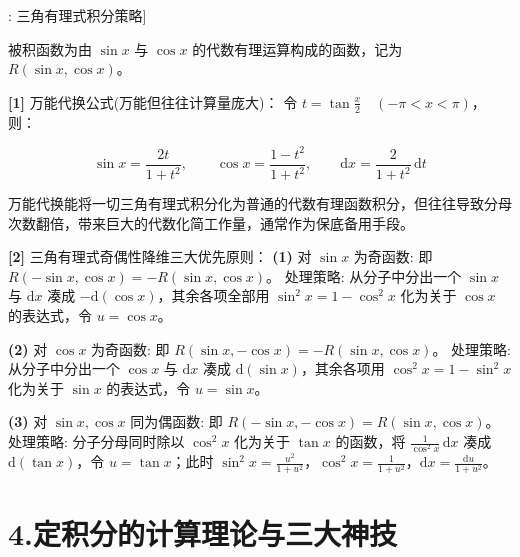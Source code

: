 \documentclass[11pt,a4paper,UTF8]{ctexart}
\begin{document}
\begin{thmbox}[方法[2]: 三角有理式积分策略]

被积函数为由 $\sin x$ 与 $\cos x$ 的代数有理运算构成的函数，记为 $R(\sin x, \cos x)$。

\textbf{[1]} 万能代换公式(万能但往往计算量庞大)：
令 $t = \tan\frac{x}{2} \quad (-\pi < x < \pi)$，则：


\begin{equation*}
\sin x = \frac{2t}{1+t^2}, \qquad \cos x = \frac{1-t^2}{1+t^2}, \qquad \mathrm{d}x = \frac{2}{1+t^2}\,\mathrm{d}t
\end{equation*}


万能代换能将一切三角有理式积分化为普通的代数有理函数积分，但往往导致分母次数翻倍，带来巨大的代数化简工作量，通常作为保底备用手段。

\textbf{[2]} 三角有理式奇偶性降维三大优先原则：
\textbf{(1)}  对 $\sin x$ 为奇函数: 即 $R(-\sin x, \cos x) = -R(\sin x, \cos x)$。
处理策略: 从分子中分出一个 $\sin x$ 与 $\mathrm{d}x$ 凑成 $-\mathrm{d}(\cos x)$，其余各项全部用 $\sin^2 x = 1 - \cos^2 x$ 化为关于 $\cos x$ 的表达式，令 $u = \cos x$。

\textbf{(2)}  对 $\cos x$ 为奇函数: 即 $R(\sin x, -\cos x) = -R(\sin x, \cos x)$。
处理策略: 从分子中分出一个 $\cos x$ 与 $\mathrm{d}x$ 凑成 $\mathrm{d}(\sin x)$，其余各项用 $\cos^2 x = 1 - \sin^2 x$ 化为关于 $\sin x$ 的表达式，令 $u = \sin x$。

\textbf{(3)}  对 $\sin x, \cos x$ 同为偶函数: 即 $R(-\sin x, -\cos x) = R(\sin x, \cos x)$。
处理策略: 分子分母同时除以 $\cos^2 x$ 化为关于 $\tan x$ 的函数，将 $\frac{1}{\cos^2 x}\,\mathrm{d}x$ 凑成 $\mathrm{d}(\tan x)$，令 $u = \tan x$；此时 $\sin^2 x = \frac{u^2}{1+u^2}$，$\cos^2 x = \frac{1}{1+u^2}$，$\mathrm{d}x = \frac{\mathrm{d}u}{1+u^2}$。

\end{thmbox}

\section{4.定积分的计算理论与三大神技}
\end{document}
